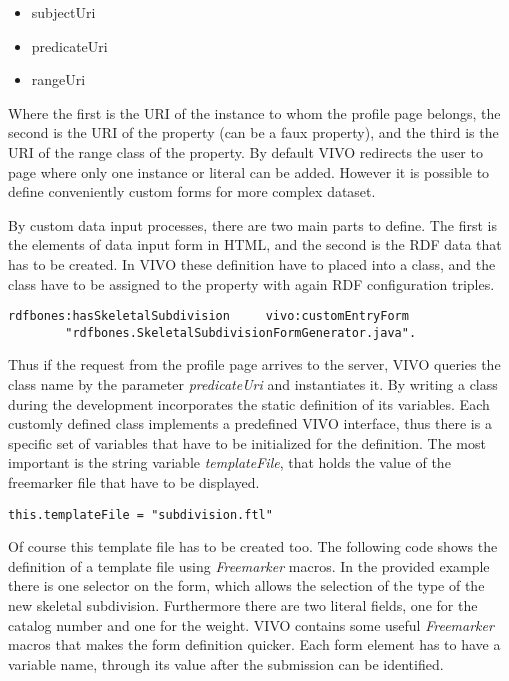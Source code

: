 \begin{itemize}
	\item{subjectUri}
	\item{predicateUri}
	\item{rangeUri}
\end{itemize}

Where the first is the URI of the instance to whom the profile page belongs, the second is the URI of the property (can be a faux property), and the third is the URI of the range class of the property. By default VIVO redirects the user to page where only one instance or literal can be added. However it is possible to define conveniently custom forms for more complex dataset.

By custom data input processes, there are two main parts to define. The first is the elements of data input form in HTML, and the second is the RDF data that has to be created. In VIVO these definition have to placed into a class, and the class have to be assigned to the property with again RDF configuration triples. 

\begin{lstlisting}[captionpos=b, caption= Entry form generator class definition, label=skullJSON, belowskip=1em, aboveskip=2em,
basicstyle=\footnotesize,frame=single]
rdfbones:hasSkeletalSubdivision		vivo:customEntryForm	
		"rdfbones.SkeletalSubdivisionFormGenerator.java".
\end{lstlisting}

Thus if the request from the profile page arrives to the server, VIVO queries the class name by the parameter \textit{predicateUri} and instantiates it. By writing a class during the development incorporates the static definition of its variables. Each customly defined class implements a predefined VIVO interface, thus there is a specific set of variables that have to be initialized for the definition. The most important is the string variable \textit{templateFile}, that holds the value of the freemarker file that have to be displayed.


\begin{lstlisting}[captionpos=b, caption= Form defintion in Java, label=skullJSON, belowskip=1em, aboveskip=2em,
basicstyle=\footnotesize,frame=single]
	this.templateFile = "subdivision.ftl"
\end{lstlisting}

Of course this template file has to be created too. The following code shows the definition of a template file using \textit{Freemarker} macros. In the provided example there is one selector on the form, which allows the selection of the type of the new skeletal subdivision. Furthermore there are two literal fields, one for the catalog number and one for the weight. VIVO contains some useful \textit{Freemarker} macros that makes the form definition quicker. Each form element has to have a variable name, through its value after the submission can be identified.


